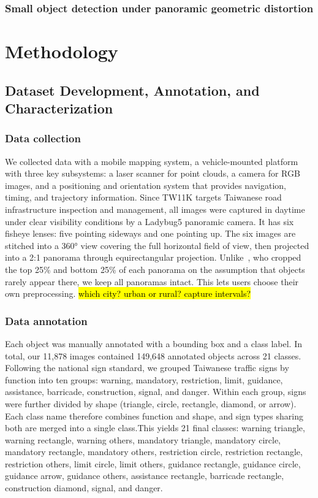 \documentclass[runningheads]{llncs}
\begin{document}
\subsubsection{Small object detection under panoramic geometric distortion}

\section{Methodology}\label{sec:method}
\subsection{Dataset Development, Annotation, and Characterization}
\subsubsection{Data collection}
We collected data with a mobile mapping system, a vehicle-mounted platform with three key subsystems: a laser scanner for point clouds, a camera for RGB images, and a positioning and orientation system that provides navigation, timing, and trajectory information. Since TW11K targets Taiwanese road infrastructure inspection and management, all images were captured in daytime under clear visibility conditions by a Ladybug5 panoramic camera. It has six fisheye lenses: five pointing sideways and one pointing up. The six images are stitched into a 360° view covering the full horizontal field of view, then projected into a 2:1 panorama through equirectangular projection. Unlike~\cite{zhu2016traffic}, who cropped the top 25\% and bottom 25\% of each panorama on the assumption that objects rarely appear there, we keep all panoramas intact. This lets users choose their own preprocessing. \hl{which city? urban or rural? capture intervals?}

\subsubsection{Data annotation}
Each object was manually annotated with a bounding box and a class label. In total, our 11,878 images contained 149,648 annotated objects across 21 classes. Following the national sign standard, we grouped Taiwanese traffic signs by function into ten groups: warning, mandatory, restriction, limit, guidance, assistance, barricade, construction, signal, and danger. Within each group, signs were further divided by shape (triangle, circle, rectangle, diamond, or arrow). Each class name therefore combines function and shape, and sign types sharing both are merged into a single class.This yields 21 final classes: warning triangle, warning rectangle, warning others, mandatory triangle, mandatory circle, mandatory rectangle, mandatory others, restriction circle, restriction rectangle, restriction others, limit circle, limit others, guidance rectangle, guidance circle, guidance arrow, guidance others, assistance rectangle, barricade rectangle, construction diamond, signal, and danger.
\end{document}
